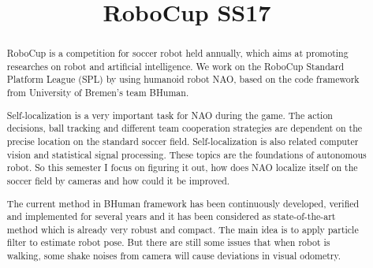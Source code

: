 \documentclass[ICS, PP, english, final]{ICS_thesis}
\begin{document}
\title{RoboCup SS17}


\maketitle



\phantom{u}
\begin{abstract}
RoboCup is a competition for soccer robot held annually, which aims at promoting researches on robot and artificial intelligence. We work on the RoboCup Standard Platform League (SPL) by using humanoid robot NAO, based on the code framework from University of Bremen's team BHuman.

Self-localization is a very important task for NAO during the game. The action decisions, ball tracking and different team cooperation strategies are dependent on the precise location on the standard soccer field. Self-localization is also related computer vision and statistical signal processing. These topics are the foundations of autonomous robot. So this semester I focus on figuring it out, how does NAO localize itself on the soccer field by cameras and how could it be improved.

The current method in BHuman framework has been continuously developed, verified and implemented for several years and it has been considered as state-of-the-art method which is already very robust and compact. The main idea is to apply particle filter to estimate robot pose. But there are still some issues that when robot is walking, some shake noises from camera will cause deviations in visual odometry.
\end{abstract}

\phantom{u}
\phantom{1}\vspace{6cm}
\begin{center}
\end{center}
\end{document}
